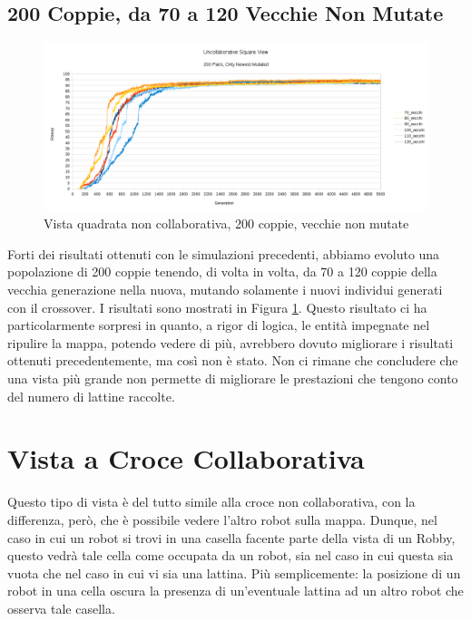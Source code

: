 \subsection{200 Coppie, da 70 a 120 Vecchie Non Mutate}
\begin{figure}[ht]
	\centering
	\includegraphics[scale=0.7,angle=90]{imgs/square_nc_200_pairs_70_120_old_not_mutated.png}
	\caption{Vista quadrata non collaborativa, 200 coppie, vecchie non mutate}
	\label{figure:square_nc_200_70_120_non}
\end{figure}
Forti dei risultati ottenuti con le simulazioni precedenti, abbiamo evoluto una
popolazione di 200 coppie tenendo, di volta in volta, da 70 a 120 coppie della
vecchia generazione nella nuova, mutando solamente i nuovi individui generati
con il crossover.\newline
I risultati sono mostrati in Figura
\ref{figure:square_nc_200_70_120_non}. Questo risultato ci ha particolarmente
sorpresi in quanto, a rigor di logica, le entità impegnate nel ripulire la
mappa, potendo vedere di più, avrebbero dovuto migliorare i risultati ottenuti
precedentemente, ma così non è stato. Non ci rimane che concludere che una vista
più grande non permette di migliorare le prestazioni che tengono conto del
numero di lattine raccolte.



\clearpage



\section{Vista a Croce Collaborativa}
Questo tipo di vista è del tutto simile alla croce non collaborativa, con la
differenza, però, che è possibile vedere l'altro robot sulla mappa. Dunque, nel
caso in cui un robot si trovi in una casella facente parte della vista di un
Robby, questo vedrà tale cella come occupata da un robot, sia nel caso in cui
questa sia vuota che nel caso in cui vi sia una lattina. Più semplicemente: la
posizione di un robot in una cella oscura la presenza di un'eventuale lattina ad
un altro robot che osserva tale casella.

